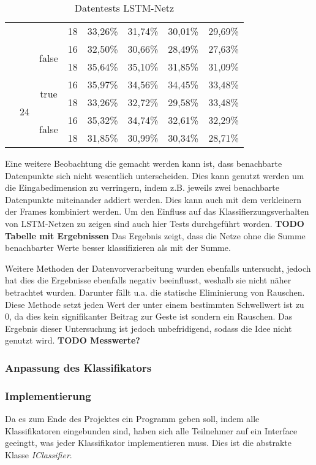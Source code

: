 \begin{table*}
\begin{tabular}{|c|c|c|c|c|c|c|c|}
  & & &18&33,26\%&31,74\%&30,01\%&29,69\%\\
  & &\multirow{2}{*}{false}&16&32,50\%&30,66\%&28,49\%&27,63\%\\
  & & &18&35,64\%&35,10\%&31,85\%&31,09\%\\
  &\multirow{4}{*}{24}&\multirow{2}{*}{true}&16&35,97\%&34,56\%&34,45\%&33,48\%\\
  & & &18&33,26\%&32,72\%&29,58\%&33,48\%\\
  & &\multirow{2}{*}{false}&16&35,32\%&34,74\%&32,61\%&32,29\%\\
  & & &18&31,85\%&30,99\%&30,34\%&28,71\%\\
\hline
\end{tabular}
\caption{Datentests LSTM-Netz}
\label{tab:inputtests}
\end{table*}
Eine weitere Beobachtung die gemacht werden kann ist, dass benachbarte
Datenpunkte sich nicht wesentlich unterscheiden. Dies kann genutzt werden um die
Eingabedimension zu verringern, indem z.B. jeweils zwei benachbarte Datenpunkte
miteinander addiert werden. Dies kann auch mit dem verkleinern der Frames
kombiniert werden. Um den Einfluss auf das Klassifierzungsverhalten von
\ac{LSTM}-Netzen zu zeigen sind auch hier Tests durchgeführt worden.
\textbf{TODO Tabelle mit Ergebnissen} Das Ergebnis zeigt, dass die Netze ohne
die Summe benachbarter Werte besser klassifizieren als mit der Summe. 

Weitere Methoden der Datenvorverarbeitung wurden ebenfalls untersucht, jedoch
hat dies die Ergebnisse ebenfalls negativ beeinflusst, weshalb sie nicht näher
betrachtet wurden. Darunter fällt u.a. die statische Eliminierung von Rauschen.
Diese Methode setzt jeden Wert der unter einem bestimmten Schwellwert ist zu 0,
da dies kein signifikanter Beitrag zur Geste ist sondern ein Rauschen. Das
Ergebnis dieser Untersuchung ist jedoch unbefridigend, sodass die Idee nicht
genutzt wird. \textbf{TODO Messwerte?}
 


\subsubsection{Anpassung des Klassifikators}
\subsubsection{Implementierung}
Da es zum Ende des Projektes ein Programm geben soll, indem alle Klassifikatoren 
eingebunden sind, haben sich alle Teilnehmer auf ein Interface geeingtt, was 
jeder Klassifikator implementieren muss. Dies ist die abstrakte Klasse \textit{IClassifier}.

